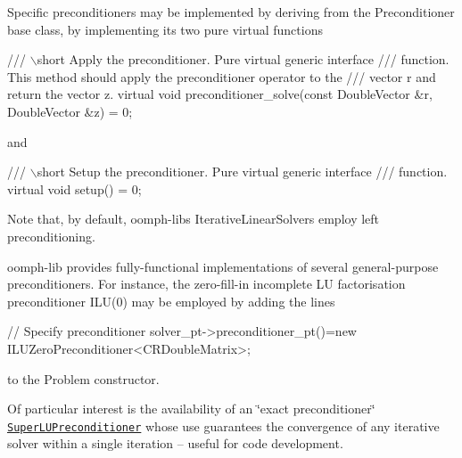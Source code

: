 Specific preconditioners may be implemented by deriving from the {\ttfamily Preconditioner} base class, by implementing its two pure virtual functions

 
\begin{DoxyCodeInclude}
  \textcolor{comment}{/// \(\backslash\)short Apply the preconditioner. Pure virtual generic interface}
\textcolor{comment}{  /// function. This method should apply the preconditioner operator to the}
\textcolor{comment}{}\textcolor{comment}{  /// vector r and return the vector z.}
\textcolor{comment}{}  \textcolor{keyword}{virtual} \textcolor{keywordtype}{void} preconditioner\_solve(\textcolor{keyword}{const} DoubleVector &r, DoubleVector &z)
  = 0;

\end{DoxyCodeInclude}


and

 
\begin{DoxyCodeInclude}
  \textcolor{comment}{/// \(\backslash\)short Setup the preconditioner. Pure virtual generic interface}
\textcolor{comment}{  /// function.}
\textcolor{comment}{}  \textcolor{keyword}{virtual} \textcolor{keywordtype}{void} setup() = 0;

\end{DoxyCodeInclude}


Note that, by default, {\ttfamily oomph-\/lib\textquotesingle{}s} {\ttfamily Iterative\+Linear\+Solvers} employ left preconditioning.

{\ttfamily oomph-\/lib} provides fully-\/functional implementations of several general-\/purpose preconditioners. For instance, the zero-\/fill-\/in incomplete LU factorisation preconditioner I\+L\+U(0) may be employed by adding the lines

 
\begin{DoxyCodeInclude}
 \textcolor{comment}{// Specify preconditioner}
 solver\_pt->preconditioner\_pt()=\textcolor{keyword}{new} ILUZeroPreconditioner<CRDoubleMatrix>; 

\end{DoxyCodeInclude}


to the {\ttfamily Problem} constructor.

Of particular interest is the availability of an \char`\"{}exact preconditioner\char`\"{} \href{../../the_data_structure/html/classoomph_1_1SuperLUPreconditioner.html}{\tt {\ttfamily Super\+L\+U\+Preconditioner}} whose use guarantees the convergence of any iterative solver within a single iteration -- useful for code development.



